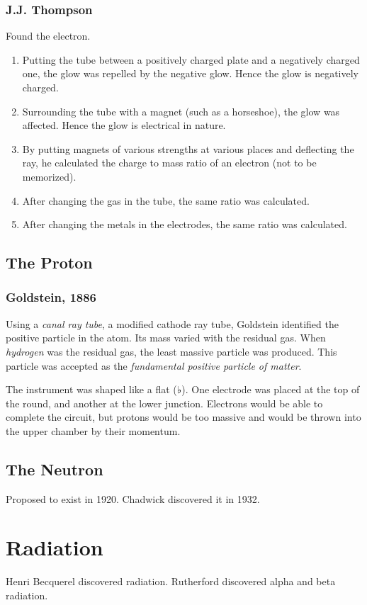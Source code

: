 \documentclass[a4paper, 8pt]{memoir}
\begin{document}
\subsubsection{J.J. Thompson}
Found the electron.
\begin{enumerate}
\item Putting the tube between a positively charged plate and a negatively charged one, the glow was repelled by the negative glow. Hence the glow is negatively charged.
\item Surrounding the tube with a magnet (such as a horseshoe), the glow was affected. Hence the glow is electrical in nature.
\item By putting magnets of various strengths at various places and deflecting the ray, he calculated the charge to mass ratio of an electron (not to be memorized).
\item After changing the gas in the tube, the same ratio was calculated.
\item After changing the metals in the electrodes, the same ratio was calculated.
\end{enumerate}
\subsection{The Proton}
\subsubsection{Goldstein, 1886}
Using a \emph{canal ray tube}, a modified cathode ray tube, Goldstein identified the positive particle in the atom. Its mass varied with the residual gas. When \emph{hydrogen} was the residual gas, the least massive particle was produced. This particle was accepted as the \emph{fundamental positive particle of matter}.

The instrument was shaped like a flat (♭). One electrode was placed at the top of the round, and another at the lower junction. Electrons would be able to complete the circuit, but protons would be too massive and would be thrown into the upper chamber by their momentum.
\subsection{The Neutron}
Proposed to exist in 1920.
Chadwick discovered it in 1932.
\section{Radiation}
Henri Becquerel discovered radiation.
Rutherford discovered alpha and beta radiation.
\end{document}

